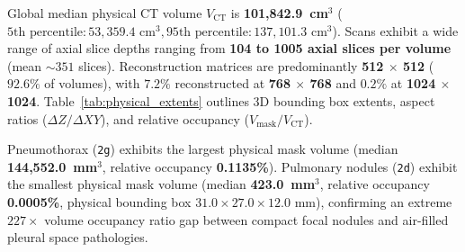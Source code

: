 \documentclass[11pt,a4paper]{article}
\begin{document}
Global median physical CT volume $V_{\text{CT}}$ is \textbf{101,842.9~cm$^3$} ($5\text{th percentile}: 53,359.4\text{ cm}^3, 95\text{th percentile}: 137,101.3\text{ cm}^3$). Scans exhibit a wide range of axial slice depths ranging from \textbf{104 to 1005 axial slices per volume} (mean $\sim 351$ slices). Reconstruction matrices are predominantly \textbf{512 $\times$ 512} ($92.6\%$ of volumes), with $7.2\%$ reconstructed at \textbf{768 $\times$ 768} and $0.2\%$ at \textbf{1024 $\times$ 1024}. Table~\ref{tab:physical_extents} outlines 3D bounding box extents, aspect ratios ($\Delta Z / \Delta XY$), and relative occupancy ($V_{\text{mask}} / V_{\text{CT}}$).

Pneumothorax (\texttt{2g}) exhibits the largest physical mask volume (median \textbf{144,552.0~mm$^3$}, relative occupancy \textbf{0.1135\%}). Pulmonary nodules (\texttt{2d}) exhibit the smallest physical mask volume (median \textbf{423.0~mm$^3$}, relative occupancy \textbf{0.0005\%}, physical bounding box $31.0 \times 27.0 \times 12.0\text{ mm}$), confirming an extreme $227\times$ volume occupancy ratio gap between compact focal nodules and air-filled pleural space pathologies.
\end{document}
